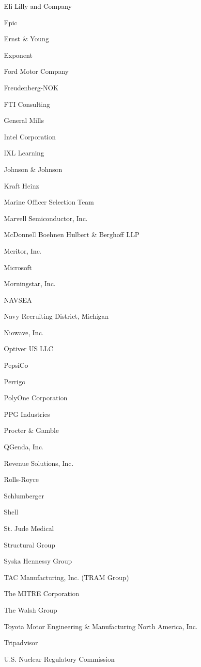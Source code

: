 \documentclass[twoside]{article}
\begin{document}
\begin{center}
\begin{multicols}{5}
\begin{FlushLeft}
\begin{compactitem}
\item Eli Lilly and Company
\item Epic
\item Ernst \& Young
\item Exponent
\item Ford Motor Company
\item Freudenberg-NOK
\item FTI Consulting
\item General Mills
\item Intel Corporation
\item IXL Learning
\item Johnson \& Johnson
\item Kraft Heinz
\item Marine Officer Selection Team
\item Marvell Semiconductor, Inc.
\item McDonnell Boehnen Hulbert \& Berghoff LLP
\item Meritor, Inc.
\item Microsoft
\item Morningstar, Inc.
\item NAVSEA
\item Navy Recruiting District, Michigan
\item Niowave, Inc.
\item Optiver US LLC
\item PepsiCo
\item Perrigo
\item PolyOne Corporation
\item PPG Industries
\item Procter \& Gamble
\item QGenda, Inc.
\item Revenue Solutions, Inc.
\item Rolls-Royce
\item Schlumberger
\item Shell
\item St. Jude Medical
\item Structural Group
\item Syska Hennessy Group
\item TAC Manufacturing, Inc. (TRAM Group)
\item The MITRE Corporation
\item The Walsh Group
\item Toyota Motor Engineering \& Manufacturing North America, Inc.
\item Tripadvisor
\item U.S. Nuclear Regulatory Commission

\end{compactitem}
\end{FlushLeft}
\end{multicols}
\end{center}
\end{document}

